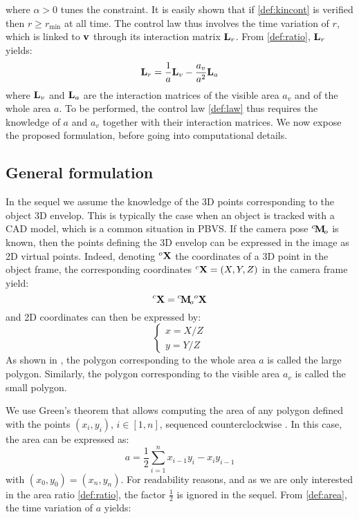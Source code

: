 \documentclass[letterpaper, 10 pt, conference]{IEEEtran}  %
\begin{document}
where $\alpha>0$ tunes the constraint. It is easily shown that if \eqref{def:kincont} is verified then $r \geq r_{\text{min}}$ at all time.
The control law thus involves the time variation of $r$, which is linked to $\mathbf{v}$ through its interaction matrix $\mathbf{L}_r$.
From \eqref{def:ratio}, $\mathbf{L}_r$ yields:
\begin{equation}\label{def:Lr}
\L_r = \frac{1}{a}\L_v - \frac{a_v}{a^2}\L_a
\end{equation}where $\mathbf{L}_v$ and $\mathbf{L}_a$ are the interaction matrices of the visible area $a_v$ and of the whole area $a$.
To be performed, the control law \eqref{def:law} thus requires the knowledge of $a$ and $a_v$ together with their interaction matrices.
We now expose the proposed formulation, before going into computational details.


\subsection{General formulation}

In the sequel we assume the knowledge of the 3D points corresponding to the object 3D envelop. This is typically the case when an object is tracked with a CAD model, which is a common situation in PBVS.
If the camera pose $\cMo$ is known, then the points defining the 3D envelop can be expressed in the image as 2D virtual points.
Indeed, denoting ${}^o\mathbf{X}$ the coordinates of a 3D point in the object frame, the corresponding coordinates ${}^c\mathbf{X}=(X,Y,Z)$ in the camera frame yield:
\begin{equation}
{}^c\X = \cMo{}^o\X
\end{equation}
and 2D coordinates can then be expressed by:
\begin{equation}\label{def:projection}
\left\{\begin{array}{l}
x = X/Z \\
y = Y/Z
\end{array}\right.
\end{equation}
As shown in , the polygon corresponding to the whole area $a$ is called the large polygon. Similarly, the polygon corresponding to the visible area $a_v$ is called the small polygon.

We use Green's theorem that allows computing the area of any polygon defined with the points $(x_i,y_i)$, $i\in[1,n]$, sequenced counterclockwise \cite{steger1996calculation}.
In this case, the area can be expressed as:
\begin{equation}\label{def:area}
a = \frac{1}{2}\sum_{i=1}^{n}{x_{i-1} y_i - x_i y_{i-1}}
\end{equation}with $(x_0,y_0) = (x_n,y_n)$. For readability reasons, and as we are only interested in the area ratio \eqref{def:ratio}, the factor $\frac{1}{2}$ is ignored in the sequel.
From \eqref{def:area}, the time variation of $a$ yields:
\end{document}
